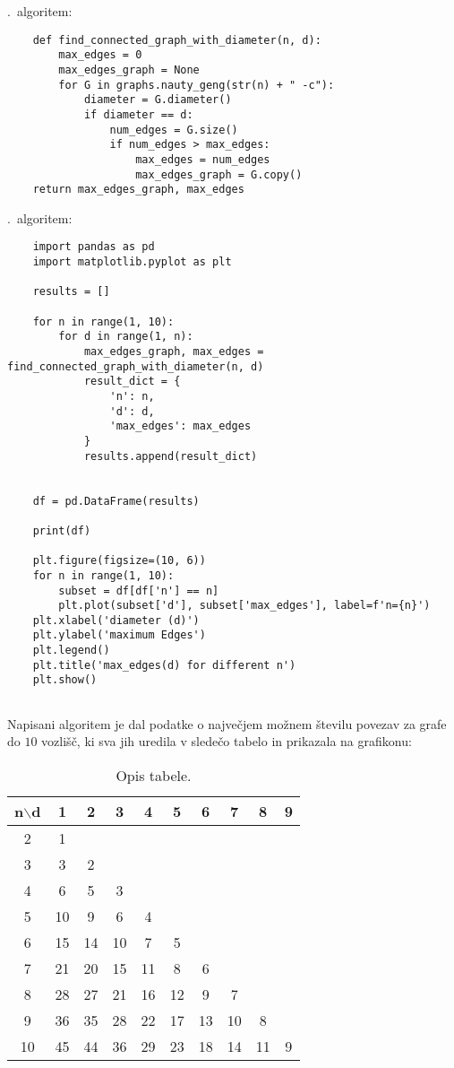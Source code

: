 \documentclass[12pt,a4paper]{amsart}
\theoremstyle{definition} %
\theoremstyle{plain} %
\begin{document}
.\ algoritem:
\begin{verbatim}
    def find_connected_graph_with_diameter(n, d):
        max_edges = 0
        max_edges_graph = None
        for G in graphs.nauty_geng(str(n) + " -c"):
            diameter = G.diameter()
            if diameter == d:
                num_edges = G.size()
                if num_edges > max_edges:
                    max_edges = num_edges
                    max_edges_graph = G.copy()
    return max_edges_graph, max_edges

\end{verbatim}
.\ algoritem:
\begin{verbatim}
    import pandas as pd
    import matplotlib.pyplot as plt
    
    results = []
    
    for n in range(1, 10):
        for d in range(1, n):
            max_edges_graph, max_edges = find_connected_graph_with_diameter(n, d)
            result_dict = {
                'n': n,
                'd': d,
                'max_edges': max_edges
            }
            results.append(result_dict)
    
    
    df = pd.DataFrame(results)
    
    print(df)
    
    plt.figure(figsize=(10, 6))
    for n in range(1, 10):
        subset = df[df['n'] == n]
        plt.plot(subset['d'], subset['max_edges'], label=f'n={n}')
    plt.xlabel('diameter (d)')
    plt.ylabel('maximum Edges')
    plt.legend()
    plt.title('max_edges(d) for different n')
    plt.show()


\end{verbatim}

Napisani algoritem je dal podatke o največjem možnem številu povezav za grafe do $10$ vozlišč,
ki sva jih uredila v sledečo tabelo in prikazala na grafikonu:

\begin{table}[h]
    \centering
    \begin{tabular}{|c|c|c|c|c|c|c|c|c|c|} 
    \hline
    \multicolumn{1}{|c|}{\textbf{n$\backslash$d}} & \textbf{1} & \textbf{2} & \textbf{3} & \textbf{4} & \textbf{5} & \textbf{6} & \textbf{7} & \textbf{8} & \textbf{9} \\ 
    \hline
    2 & 1 & & & & & & & & \\ 
    3 & 3 & 2 & & & & & & & \\ 
    4 & 6 & 5 & 3 & & & & & & \\
    5 & 10 & 9 & 6 & 4 & & & & & \\
    6 & 15 & 14 & 10 & 7 & 5 & & & & \\ 
    7 & 21 & 20 & 15 & 11 & 8 & 6 & & & \\ 
    8 & 28 & 27 & 21 & 16 & 12 & 9 & 7 & & \\ 
    9 & 36 & 35 & 28 & 22 & 17 & 13 & 10 & 8 & \\ 
    10 & 45 & 44 & 36 & 29 & 23 & 18 & 14 & 11 & 9 \\ 
    \hline
    \end{tabular}
    \caption{Opis tabele.}
    \label{tab:tabela1}
\end{table}
\end{document}
